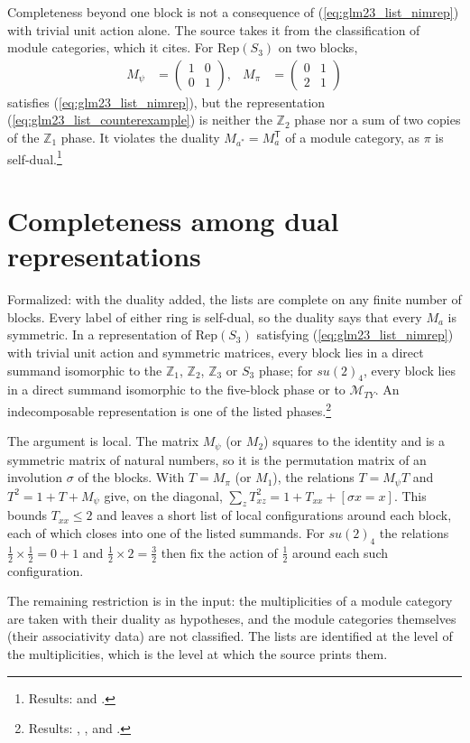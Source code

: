 \documentclass{article}
\begin{document}
Completeness beyond one block is not a consequence of
(\ref{eq:glm23_list_nimrep}) with trivial unit action alone. The source takes
it from the classification of module categories, which it cites. For
$\mathrm{Rep}(S_3)$ on two blocks,
\begin{align}
    M_\psi & =\begin{pmatrix}1&0\\0&1\end{pmatrix}, &
    M_\pi  & =\begin{pmatrix}0&1\\2&1\end{pmatrix}
    \label{eq:glm23_list_counterexample}
\end{align}
satisfies (\ref{eq:glm23_list_nimrep}), but the representation
(\ref{eq:glm23_list_counterexample}) is neither the $\mathbb Z_2$
phase nor a sum of two copies of the $\mathbb Z_1$ phase. It violates the
duality $M_{a^*}=M_a^{\mathsf T}$ of a module category, as $\pi$ is
self-dual.\footnote{Results:
     and
    .}

\section{Completeness among dual representations}
Formalized: with the duality added, the lists are complete on any finite
number of blocks. Every label of either ring is self-dual, so the duality
says that every $M_a$ is symmetric. In a representation of
$\mathrm{Rep}(S_3)$ satisfying (\ref{eq:glm23_list_nimrep}) with trivial unit
action and symmetric matrices, every block lies in a direct summand
isomorphic to the $\mathbb Z_1$, $\mathbb Z_2$, $\mathbb Z_3$ or $S_3$
phase; for $su(2)_4$, every block lies in a direct summand isomorphic to the
five-block phase or to $\mathcal M_{TY}$. An indecomposable representation
is one of the listed phases.\footnote{Results:
    ,
    ,
     and
    .}

The argument is local. The matrix $M_\psi$ (or $M_2$) squares to the
identity and is a symmetric matrix of natural numbers, so it is the
permutation matrix of an involution $\sigma$ of the blocks. With
$T=M_\pi$ (or $M_1$), the relations $T=M_\psi T$ and
$T^2=1+T+M_\psi$ give, on the diagonal,
$\sum_z T_{xz}^2=1+T_{xx}+[\sigma x=x]$. This bounds $T_{xx}\le2$ and
leaves a short list of local configurations around each block, each of
which closes into one of the listed summands. For $su(2)_4$ the relations
$\tfrac12\times\tfrac12=0+1$ and $\tfrac12\times2=\tfrac32$ then fix the
action of $\tfrac12$ around each such configuration.

The remaining restriction is in the input: the multiplicities of a module
category are taken with their duality as hypotheses, and the module
categories themselves (their associativity data) are not classified. The
lists are identified at the level of the multiplicities, which is the level
at which the source prints them.


\end{document}
